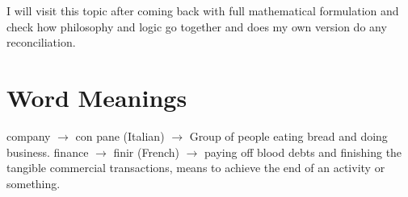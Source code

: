 \documentclass[12pt]{extarticle}
\theoremstyle{definition}
\begin{document}
I will visit this topic after coming back with full mathematical formulation and check how philosophy and logic go together and does my own version do any reconciliation.




\appendix

\section{Word Meanings}
company $\rightarrow$ con pane (Italian) $\rightarrow$ Group of people eating bread and doing business.\newline
finance $\rightarrow$ finir (French) $\rightarrow$ paying off blood debts and finishing the tangible commercial transactions, means to achieve the end of an activity or something.
\end{document}

